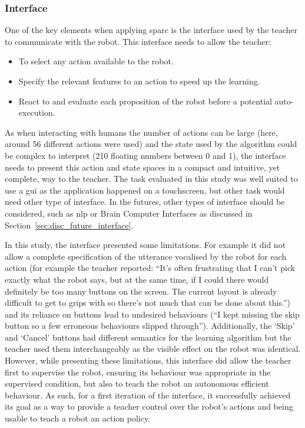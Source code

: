 \subsubsection{Interface} \label{sec:tuto_interface}

One of the key elements when  applying \gls{sparc} is the interface used by the teacher to communicate with the robot. This interface needs to allow the teacher:
\begin{itemize}
	\item To select any action available to the robot.
	\item Specify the relevant features to an action to speed up the learning.
	\item React to and evaluate each proposition of the robot before a potential auto-execution.
\end{itemize}
As when interacting with humans the number of actions can be large (here, around 56 different actions were used) and the state used by the algorithm could be complex to interpret (210 floating numbers between 0 and 1), the interface needs to present this action and state spaces in a compact and intuitive, yet complete, way to the teacher. The task evaluated in this study was well suited to use a \gls{gui} as the application happened on a touchscreen, but other task would need other type of interface. In the futures, other types of interface should be considered, such as \gls{nlp} or Brain Computer Interfaces as discussed in Section~\ref{sec:disc_future_interface}.

In this study, the interface presented some limitations. For example it did not allow a complete specification of the utterance vocalised by the robot for each action (for example the teacher reported: ``It’s often frustrating that I can’t pick exactly what the robot says, but at the same time, if I could there would definitely be too many buttons on the screen. The current layout is already difficult to get to grips with so there’s not much that can be done about this.'') and its reliance on buttons lead to undesired behaviours (``I kept missing the skip button so a few erroneous behaviours slipped through''). Additionally, the `Skip' and `Cancel' buttons had different semantics for the learning algorithm but the teacher used them interchangeably as the visible effect on the robot was identical. However, while presenting these limitations, this interface did allow the teacher first to supervise the robot, ensuring its behaviour was appropriate in the supervised condition, but also to teach the robot an autonomous efficient behaviour. As such, for a first iteration of the interface, it successfully achieved its goal as a way to provide a teacher control over the robot's actions and being usable to teach a robot an action policy.



